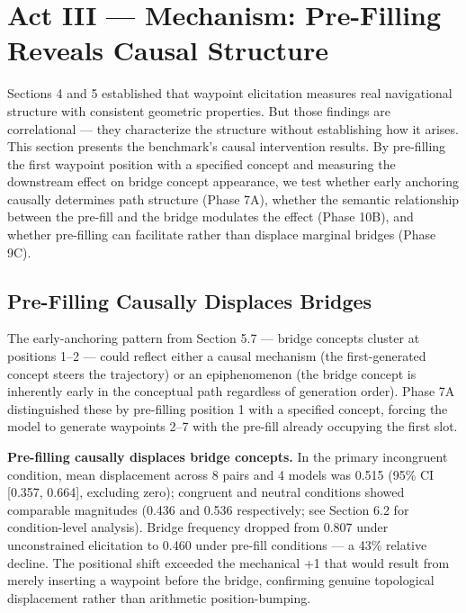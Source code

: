 \section{Act III --- Mechanism: Pre-Filling Reveals Causal Structure}\label{act-iii-mechanism-pre-filling-reveals-causal-structure}

Sections 4 and 5 established that waypoint elicitation measures real navigational structure with consistent geometric properties. But those findings are correlational --- they characterize the structure without establishing how it arises. This section presents the benchmark's causal intervention results. By pre-filling the first waypoint position with a specified concept and measuring the downstream effect on bridge concept appearance, we test whether early anchoring causally determines path structure (Phase 7A), whether the semantic relationship between the pre-fill and the bridge modulates the effect (Phase 10B), and whether pre-filling can facilitate rather than displace marginal bridges (Phase 9C).

\subsection{Pre-Filling Causally Displaces Bridges}\label{pre-filling-causally-displaces-bridges}

The early-anchoring pattern from Section 5.7 --- bridge concepts cluster at positions 1--2 --- could reflect either a causal mechanism (the first-generated concept steers the trajectory) or an epiphenomenon (the bridge concept is inherently early in the conceptual path regardless of generation order). Phase 7A distinguished these by pre-filling position 1 with a specified concept, forcing the model to generate waypoints 2--7 with the pre-fill already occupying the first slot.

\textbf{Pre-filling causally displaces bridge concepts.} In the primary incongruent condition, mean displacement across 8 pairs and 4 models was 0.515 (95\% CI {[}0.357, 0.664{]}, excluding zero); congruent and neutral conditions showed comparable magnitudes (0.436 and 0.536 respectively; see Section 6.2 for condition-level analysis). Bridge frequency dropped from 0.807 under unconstrained elicitation to 0.460 under pre-fill conditions --- a 43\% relative decline. The positional shift exceeded the mechanical +1 that would result from merely inserting a waypoint before the bridge, confirming genuine topological displacement rather than arithmetic position-bumping.

